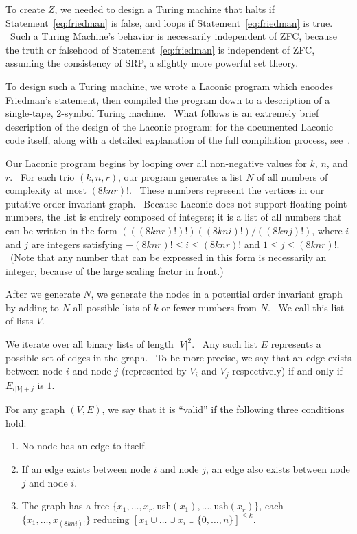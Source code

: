 \documentclass[11pt]{article}
\begin{document}
To create $Z$, we needed to design a Turing machine that halts if Statement~\ref{eq:friedman} is false, and loops if Statement~\ref{eq:friedman} is true. \ Such a Turing Machine's behavior is necessarily independent of ZFC, because the truth or falsehood of Statement~\ref{eq:friedman} is independent of ZFC, assuming the consistency of SRP, a slightly more powerful set theory.~\cite{friedman}

To design such a Turing machine, we wrote a Laconic program which encodes Friedman's statement, then compiled the program down to a description of a single-tape, $2$-symbol Turing machine. \ What follows is an extremely brief description of the design of the Laconic program; for the documented Laconic code itself, along with a detailed explanation of the full compilation process, see~\cite{github}.

Our Laconic program begins by looping over all non-negative values for $k$, $n$, and $r$. \ For each trio $(k, n, r)$, our program generates a list $N$ of all numbers of complexity at most $(8knr)!$. \ These numbers represent the vertices in our putative order invariant graph. \ Because Laconic does not support floating-point numbers, the list is entirely composed of integers; it is a list of all numbers that can be written in the form $(((8knr)!)!)((8kni)!)/((8knj)!)$, where $i$ and $j$ are integers satisfying $-(8knr)! \le i \le (8knr)!$ and $1 \le j \le (8knr)!$. \ (Note that any number that can be expressed in this form is necessarily an integer, because of the large scaling factor in front.)

After we generate $N$, we generate the nodes in a potential order invariant graph by adding to $N$ all possible lists of $k$ or fewer numbers from $N$. \ We call this list of lists $V$.

We iterate over all binary lists of length $|V|^2$. \ Any such list $E$ represents a possible set of edges in the graph. \ To be more precise, we say that an edge exists between node $i$ and node $j$ (represented by $V_i$ and $V_j$ respectively) if and only if $E_{i|V| + j}$ is $1$.

For any graph $(V, E)$, we say that it is ``valid'' if the following three conditions hold:

\begin{enumerate}

\item No node has an edge to itself.
\item If an edge exists between node $i$ and node $j$, an edge also exists between node $j$ and node $i$.
\item The graph has a free $\{x_1,\dots,x_r, \textrm{ush}(x_1),...,\textrm{ush}(x_r)\}$, each  $\{x_1, \dots, x_{(8kni)!}\}$ reducing $[x_1 \cup \dots \cup x_i \cup \{0,\dots,n\}]^{\le k}$.

\end{enumerate}
\end{document}
